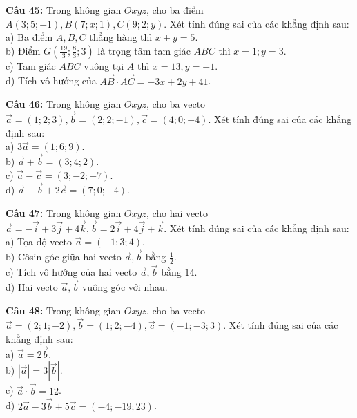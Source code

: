 \documentclass[12pt]{article}
\begin{document}
	\vspace{4mm}
	\noindent \textbf{Câu 45:} Trong không gian $Oxyz$, cho ba điểm $A(3; 5; -1), B(7; x; 1), C(9; 2; y)$. Xét tính đúng sai của các khẳng định sau: \\
	\noindent a) Ba điểm $A, B, C$ thẳng hàng thì $x + y = 5$. \\
	\noindent b) Điểm $G\left(\frac{19}{3}; \frac{8}{3}; 3\right)$ là trọng tâm tam giác $ABC$ thì $x = 1; y = 3$. \\
	\noindent c) Tam giác $ABC$ vuông tại $A$ thì $x = 13, y = -1$. \\
	\noindent d) Tích vô hướng của $\vec{AB} \cdot \vec{AC} = -3x + 2y + 41$.
	
	\vspace{4mm}
	\noindent \textbf{Câu 46:} Trong không gian $Oxyz$, cho ba vecto $\vec{a} = (1; 2; 3), \vec{b} = (2; 2; -1), \vec{c} = (4; 0; -4)$. Xét tính đúng sai của các khẳng định sau: \\
	\noindent a) $3\vec{a} = (1; 6; 9)$. \\
	\noindent b) $\vec{a} + \vec{b} = (3; 4; 2)$. \\
	\noindent c) $\vec{a} - \vec{c} = (3; -2; -7)$. \\
	\noindent d) $\vec{a} - \vec{b} + 2\vec{c} = (7; 0; -4)$.
	
	\vspace{4mm}
	\noindent \textbf{Câu 47:} Trong không gian $Oxyz$, cho hai vecto $\vec{a} = -\vec{i} + 3\vec{j} + 4\vec{k}, \vec{b} = 2\vec{i} + 4\vec{j} + \vec{k}$. Xét tính đúng sai của các khẳng định sau: \\
	\noindent a) Tọa độ vecto $\vec{a} = (-1; 3; 4)$. \\
	\noindent b) Côsin góc giữa hai vecto $\vec{a}, \vec{b}$ bằng $\frac{1}{2}$. \\
	\noindent c) Tích vô hướng của hai vecto $\vec{a}, \vec{b}$ bằng $14$. \\
	\noindent d) Hai vecto $\vec{a}, \vec{b}$ vuông góc với nhau.
	
	\vspace{4mm}
	\noindent \textbf{Câu 48:} Trong không gian $Oxyz$, cho ba vecto $\vec{a} = (2; 1; -2), \vec{b} = (1; 2; -4), \vec{c} = (-1; -3; 3)$. Xét tính đúng sai của các khẳng định sau: \\
	\noindent a) $\vec{a} = 2\vec{b}$. \\
	\noindent b) $|\vec{a}| = 3|\vec{b}|$. \\
	\noindent c) $\vec{a} \cdot \vec{b} = 12$. \\
	\noindent d) $2\vec{a} - 3\vec{b} + 5\vec{c} = (-4; -19; 23)$.
	
\end{document}
